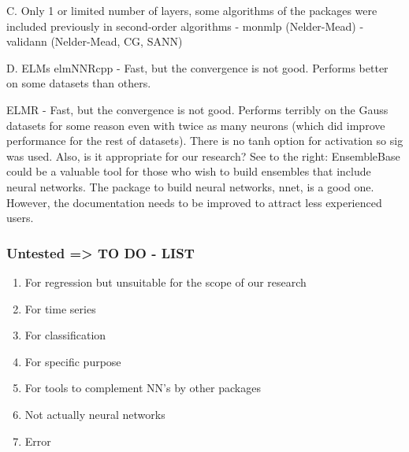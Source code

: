 C. Only 1 or limited number of layers, some algorithms of the packages
were included previously in second-order algorithms - monmlp
(Nelder-Mead) - validann (Nelder-Mead, CG, SANN)

D. ELMs elmNNRcpp - Fast, but the convergence is not good. Performs
better on some datasets than others.

ELMR - Fast, but the convergence is not good. Performs terribly on the
Gauss datasets for some reason even with twice as many neurons (which
did improve performance for the rest of datasets). There is no tanh
option for activation so sig was used. Also, is it appropriate for our
research? See to the right: EnsembleBase could be a valuable tool for
those who wish to build ensembles that include neural networks. The
package to build neural networks, nnet, is a good one. However, the
documentation needs to be improved to attract less experienced users.

\hypertarget{untested-to-do---list}{%
\subsubsection{Untested =\textgreater{} TO DO -
LIST}\label{untested-to-do---list}}

\begin{enumerate}
\def\labelenumi{\arabic{enumi}.}
\tightlist
\item
  For regression but unsuitable for the scope of our research
\item
  For time series
\item
  For classification
\item
  For specific purpose
\item
  For tools to complement NN's by other packages
\item
  Not actually neural networks
\item
  Error 
\end{enumerate}

